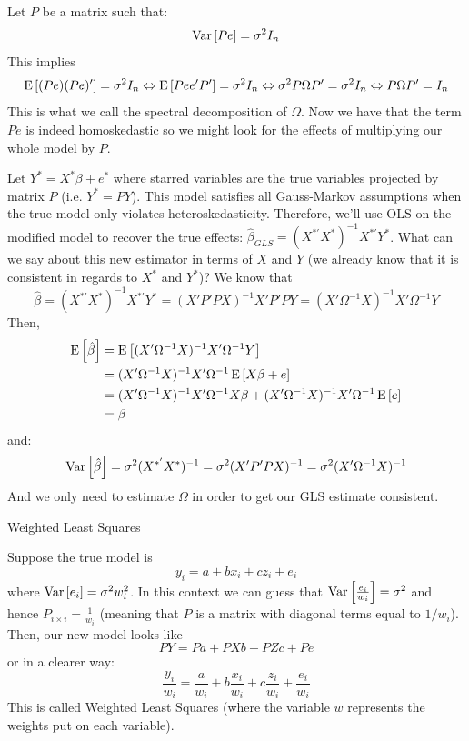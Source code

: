 Let $P$ be a matrix such that: $$\operatorname{Var}\left[Pe\right] = \sigma^2I_n $$ This implies $$\operatorname{E}\left[(Pe)(Pe)'\right] = \sigma^2I_n \Leftrightarrow \operatorname{E}\left[Pee'P'\right] = \sigma^2 I_n \Leftrightarrow \sigma^2P\Omega P' = \sigma^2 I_n \Leftrightarrow P\Omega P' = I_n$$ This is what we call the spectral decomposition of $\Omega$. Now we have that the term $Pe$ is indeed homoskedastic so we might look for the effects of multiplying our whole model by $P$.

Let $Y^* = X^*\beta + e^*$ where starred variables are the true variables projected by matrix $P$ (i.e. $Y^* = PY$). This model satisfies all Gauss-Markov assumptions when the true model only violates heteroskedasticity. Therefore, we'll use OLS on the modified model to recover the true effects: $\hat\beta_{GLS} = (X^{*'}X^*)^{-1}X^{*'}Y^*$. What can we say about this new estimator in terms of $X$ and $Y$ (we already know that it is consistent in regards to $X^*$ and $Y^*$)? We know that $$\hat\beta = (X^{*'}X^*)^{-1}X^{*'}Y^* = (X'P'PX)^{-1}X'P'PY = (X'\Omega^{-1}X)^{-1}X'\Omega^{-1} Y $$ Then, \begin{align*} 
\operatorname{E}\left[\hat\beta\right] & = \operatorname{E}\left[(X'\Omega^{-1} X)^{-1}X'\Omega^{-1} Y\right] \\ 
& = (X'\Omega^{-1} X)^{-1}X'\Omega^{-1}\operatorname{E}\left[X\beta + e\right] \\
& = (X'\Omega^{-1} X)^{-1}X'\Omega^{-1}X\beta + (X'\Omega^{-1} X)^{-1}X'\Omega^{-1}\operatorname{E}\left[e\right] \\
& = \beta
\end{align*}
and:\begin{align*}
\operatorname{Var}\left[\hat\beta\right] = \sigma^2(X^{*'}X^*)^{-1} = \sigma^2(X'P'PX)^{-1} = \sigma^2(X'\Omega^{-1} X)^{-1}
\end{align*} And we only need to estimate $\Omega$ in order to get our GLS estimate consistent.

\begin{bclogo}[couleur=blue!10, arrondi=0.1, logo=,ombre=false]{ Weighted Least Squares} 
\begin{small}
Suppose the true model is $$y_i = a + bx_i + cz_i + e_i $$ where $\operatorname{Var}\left[e_i\right] = \sigma^2w_i^2$. In this context we can guess that $\operatorname{Var}\left[\frac{e_i}{w_i}\right] = \sigma^2$ and hence $P_{i\times i} = \frac{1}{w_i}$ (meaning that $P$ is a matrix with diagonal terms equal to $1/w_i$). Then, our new model looks like $$PY = Pa + PXb + PZc + Pe$$ or in a clearer way: $$\frac{y_i}{w_i} = \frac{a}{w_i} + b\frac{x_i}{w_i} + c\frac{z_i}{w_i} + \frac{e_i}{w_i} $$ This is called Weighted Least Squares (where the variable $w$ represents the weights put on each variable).
\end{small}
\end{bclogo}

